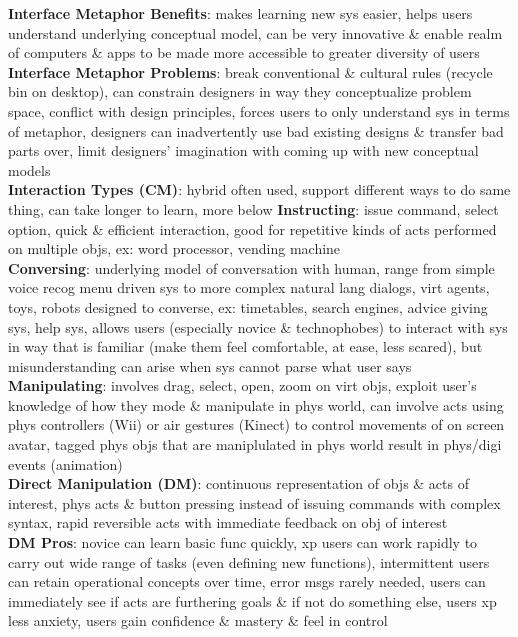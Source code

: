 \documentclass[a4paper]{article}
\begin{document}
\begin{multicols}{3}
        \textbf{Interface Metaphor Benefits}: makes learning new sys easier, helps users understand underlying conceptual model, can be very innovative \& enable realm of computers \& apps to be made more accessible to greater diversity of users\\
        \textbf{Interface Metaphor Problems}: break conventional \& cultural rules (recycle bin on desktop), can constrain designers in way they conceptualize problem space, conflict with design principles, forces users to only understand sys in terms of metaphor, designers can inadvertently use bad existing designs \& transfer bad parts over, limit designers' imagination with coming up with new conceptual models\\
        \textbf{Interaction Types (CM)}: hybrid often used, support different ways to do same thing, can take longer to learn, more below
        \textbf{Instructing}: issue command, select option, quick \& efficient interaction, good for repetitive kinds of acts performed on multiple objs, ex: word processor, vending machine\\
        \textbf{Conversing}: underlying model of conversation with human, range from simple voice recog menu driven sys to more complex natural lang dialogs, virt agents, toys, robots designed to converse, ex: timetables, search engines, advice giving sys, help sys, allows users (especially novice \& technophobes) to interact with sys in way that is familiar (make them feel comfortable, at ease, less scared), but misunderstanding can arise when sys cannot parse what user says\\
        \textbf{Manipulating}: involves drag, select, open, zoom on virt objs, exploit user's knowledge of how they mode \& manipulate in phys world, can involve acts using phys controllers (Wii) or air gestures (Kinect) to control movements of on screen avatar, tagged phys objs that are maniplulated in phys world result in phys/digi events (animation)\\
        \textbf{Direct Manipulation (DM)}: continuous representation of objs \& acts of interest, phys acts \& button pressing instead of issuing commands with complex syntax, rapid reversible acts with immediate feedback on obj of interest\\
        \textbf{DM Pros}: novice can learn basic func quickly, xp users can work rapidly to carry out wide range of tasks (even defining new functions), intermittent users can retain operational concepts over time, error msgs rarely needed, users can immediately see if acts are furthering goals \& if not do something else, users xp less anxiety, users gain confidence \& mastery \& feel in control\\

\end{multicols}
\end{document}
